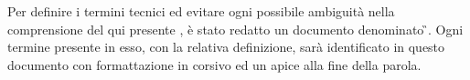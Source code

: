 Per definire i termini tecnici ed evitare ogni possibile ambiguità nella comprensione del qui presente \PdP{}, è stato redatto un documento denominato \G{}. Ogni termine presente in esso, con la relativa definizione, sarà identificato in questo documento con formattazione in corsivo ed un apice \glo{} alla fine della parola.
